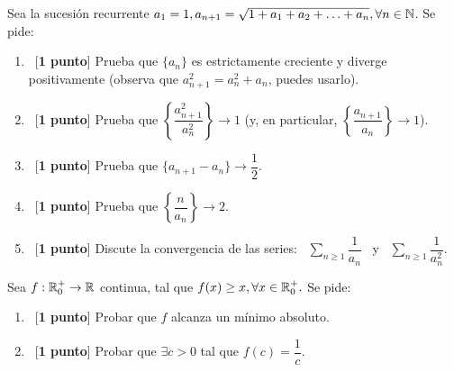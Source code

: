\documentclass[12pt]{article}
\begin{document}
    \begin{ejercicio}
    Sea la sucesión recurrente $a_1 = 1, a_{n+1} = \sqrt{1 + a_1 + a_2 +  \dotsc + a_n}, {\forall n \in {\mathbb{N}}}$. Se pide:
        \begin{enumerate}[label=\alph*)]
            \item\ [\textbf{1 punto}] Prueba que $\{a_n\}$ es estrictamente creciente y diverge positivamente (observa que $a^2_{n+1} = a^2_n + a_n$, puedes usarlo).
            \item\ [\textbf{1 punto}] Prueba que $\left\{\dfrac{a^2_{n+1}}{a^2_n}\right\} \rightarrow 1$ (y, en particular, $\left\{\dfrac{a_{n+1}}{a_n}\right\} \rightarrow 1$).
            \item\ [\textbf{1 punto}] Prueba que $\{a_{n+1} - a_n\} \rightarrow \dfrac{1}{2}$.
            \item\ [\textbf{1 punto}] Prueba que $\left\{\dfrac{n}{a_n}\right\} \rightarrow 2$.
            \item\ [\textbf{1 punto}] Discute la convergencia de las series: \ $\displaystyle \sum\limits_{n\geq 1} \dfrac{1}{a_n}$ \ y \ $\displaystyle \sum\limits_{n\geq1} \dfrac{1}{a^2_n}$. \\
        \end{enumerate}
    \end{ejercicio}

    \begin{ejercicio}
        Sea $f: {\mathbb{R}}^+_0 \rightarrow {\mathbb{R}}$ continua, tal que $f(x) \geq x, \forall x \in {\mathbb{R}}^+_0.$ Se pide:
        \begin{enumerate}[label=\alph*)]
            \item\ [\textbf{1 punto}] Probar que $f$ alcanza un mínimo absoluto.
            \item\ [\textbf{1 punto}] Probar que $\exists c > 0 $ tal que $f(c) = \dfrac{1}{c}$. \\
        \end{enumerate}
    \end{ejercicio}

    \newpage
    \setcounter{ejercicio}{0} %
\end{document}
